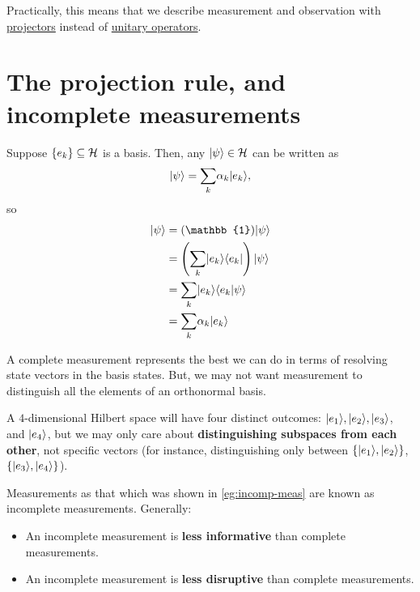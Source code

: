 \documentclass[12pt]{article}
\begin{document}
\begin{remark}
Practically, this means that we describe measurement and observation with \underline{projectors} instead of \underline{unitary operators}.
\end{remark}

\section{The projection rule, and incomplete measurements}
\begin{proposition}\label{prop:projection-to-basis}
Suppose $\{e_k\}\subseteq \HHH$ is a basis. Then, any $\Ket{\psi}\in \HHH$ can be written as $$
\Ket{\psi} = \underset{k}{\sum} \alpha_k\Ket{e_k},
$$ so $$
\begin{aligned}
\Ket{\psi}
    &= (\mathbb{1}) \Ket{\psi}\\
    &= \prt{\underset{k}{\sum} \kb{e_k}{e_k}} \Ket{\psi}\\
    &= \underset{k}{\sum} \Ket{e_k}\bk{e_k}{\psi}\\
    &= \underset{k}{\sum} \alpha_k\Ket{e_k}
\end{aligned}
$$
\end{proposition}

\begin{remark}
A complete measurement represents the best we can do in terms of resolving state vectors in the basis states. But, we may not want measurement to distinguish all the elements of an orthonormal basis.
\end{remark}

\begin{example}\label{eg:incomp-meas}
A $4$-dimensional Hilbert space will have four distinct outcomes: $\Ket{e_1}, \Ket{e_2}, \Ket{e_3}$, and $\Ket{e_4}$, but we may only care about \textbf{distinguishing subspaces from each other}, not specific vectors (for instance, distinguishing only between $\{\Ket{e_1}, \Ket{e_2}\}$, $\{\Ket{e_3}, \Ket{e_4}\}$).
\end{example}

\begin{definition}
Measurements as that which was shown in \ref{eg:incomp-meas} are known as incomplete measurements. Generally:
\begin{itemize}
    \item An incomplete measurement is \textbf{less informative} than complete measurements.
    \item An incomplete measurement is \textbf{less disruptive} than complete measurements.
\end{itemize}
\end{definition}
\end{document}
